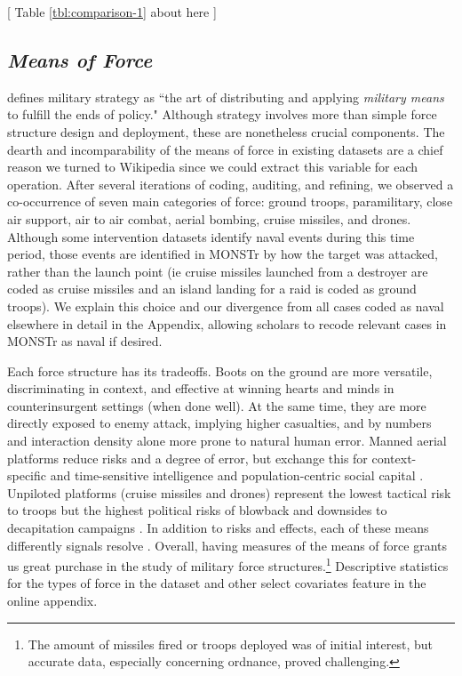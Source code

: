 \documentclass[fleqn,12pt]{article}
\begin{document}
\begin{center}
	[ Table \ref{tbl:comparison-1} about here ]
\end{center}

\subsection*{\textit{Means of Force}}
\citet[335]{hart_strategyindirectapproach_1967} defines military strategy as ``the art of distributing and applying \textit{military means} to fulfill the ends of policy." Although strategy involves more than simple force structure design and deployment, these are nonetheless crucial components. The dearth and incomparability of the means of force in existing datasets are a chief reason we turned to Wikipedia since we could extract this variable for each operation. After several iterations of coding, auditing, and refining, we observed a co-occurrence of seven main categories of force: ground troops, paramilitary, close air support, air to air combat, aerial bombing, cruise missiles, and drones. Although some intervention datasets identify naval events during this time period, those events are identified in MONSTr by how the target was attacked, rather than the launch point (ie cruise missiles launched from a destroyer are coded as cruise missiles and an island landing for a raid is coded as ground troops). We explain this choice and our divergence from all cases coded as naval elsewhere in detail in the Appendix, allowing scholars to recode relevant cases in MONSTr as naval if desired.

Each force structure has its tradeoffs. Boots on the ground are more versatile, discriminating in context, and effective at winning hearts and minds in counterinsurgent settings (when done well). At the same time, they are more directly exposed to enemy attack, implying higher casualties, and by numbers and interaction density alone more prone to natural human error. Manned aerial platforms reduce risks and a degree of error, but exchange this for context-specific and time-sensitive intelligence and population-centric social capital \citep{lyall_ragemachinesexplaining_2009}. Unpiloted platforms (cruise missiles and drones) represent the lowest tactical risk to troops but the highest political risks of blowback \citep{johnston_impactusdrone_2016} and downsides to decapitation campaigns \citep{price_targetingtopterrorists_2012}. In addition to risks and effects, each of these means differently signals resolve \citep{zegart_cheapfightscredible_2018}. Overall, having measures of the means of force grants us great purchase in the study of military force structures.\footnote{The amount of missiles fired or troops deployed was of initial interest, but accurate data, especially concerning ordnance, proved challenging.} Descriptive statistics for the types of force in the dataset and other select covariates feature in the online appendix.
\end{document}
